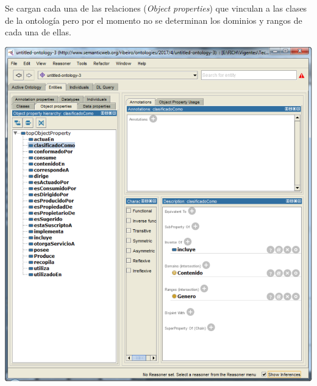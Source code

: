 \documentclass[a4paper,10pt,spanish,oneside]{article}
\begin{document}
\begin{minipage}{0.3\linewidth}

Se cargan cada una de las relaciones (\textit{Object properties}) que vinculan a las clases de la ontología pero por el momento no se determinan los dominios y rangos de cada una de ellas.

\end{minipage} \hfill \begin{minipage}{0.65\linewidth}

\begin{center}
\includegraphics[width=\linewidth]{2}
\end{center}

\end{minipage}
\end{document}
